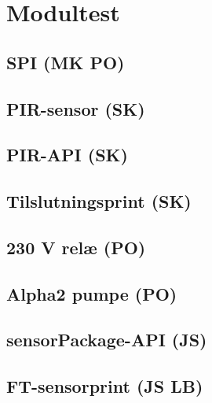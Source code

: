 \chapter{Modultest}

\section{SPI (MK PO)}


\section{PIR-sensor (SK)}


\section{PIR-API (SK)}


\section{Tilslutningsprint (SK)}


\section{230 V relæ (PO)}


\section{Alpha2 pumpe (PO)}


\section{sensorPackage-API (JS)}


\section{FT-sensorprint (JS LB)}




